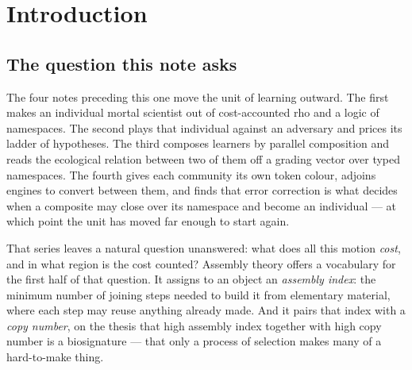 \documentclass[11pt]{article}
\theoremstyle{plain}
\theoremstyle{definition}
\theoremstyle{remark}
\newcommand{\CN}{\mathrm{CN}}
\begin{document}
\begin{abstract}
Two things follow that we did not expect. Copies are forced by
repairability and by sampling before they are wanted for statistics, and
the sampling requirement is exponential in depth, so $\CN \gtrsim p^{-h}$
for any ecology that actually uses its architecture: the joint biosignature
acquires a functional form whose base is medium reliability. And the
assembly budget of a multi-skilled mind is dominated by the number of
distinct niches it addresses rather than by the depth of its architecture,
because self-similar architecture is paid for once. A worked
four-skill individual, computed in full, spends $57\%$ of its floor on
content and saves $35\%$ of the unshared budget by sharing its kernel.
\end{abstract}

\tableofcontents

\section{Introduction}\label{sco:S1}

\subsection{The question this note asks}\label{sco:S1.1}

The four notes preceding this one move the unit of learning outward. The
first \cite{scientist} makes an individual mortal scientist out of
cost-accounted rho and a logic of namespaces. The second \cite{game} plays
that individual against an adversary and prices its ladder of hypotheses.
The third \cite{compose} composes learners by parallel composition and
reads the ecological relation between two of them off a grading vector
over typed namespaces. The fourth \cite{engine} gives each community its
own token colour, adjoins engines to convert between them, and finds that
error correction is what decides when a composite may close over its
namespace and become an individual --- at which point the unit has moved
far enough to start again.

That series leaves a natural question unanswered: what does all this
motion \emph{cost}, and in what region is the cost counted? Assembly
theory \cite{assembly,biosig} offers a vocabulary for the first half of
that question. It assigns to an object an \emph{assembly index}: the
minimum number of joining steps needed to build it from elementary
material, where each step may reuse anything already made. And it pairs
that index with a \emph{copy number}, on the thesis that high assembly
index together with high copy number is a biosignature --- that only a
process of selection makes many of a hard-to-make thing.
\end{document}
